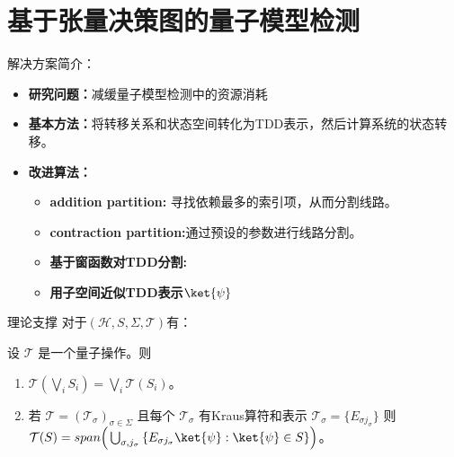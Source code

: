\documentclass[aspectratio=1610]{ctexbeamer}
\begin{document}
\section{基于张量决策图的量子模型检测}
\begin{frame}{解决方案简介：}
    \begin{itemize}
        \item \textbf{研究问题：}减缓量子模型检测中的资源消耗
        \item \textbf{基本方法：}将转移关系和状态空间转化为TDD表示，然后计算系统的状态转移。
        \item \textbf{改进算法：}
        \begin{itemize}
            \item \textbf{addition partition:} 寻找依赖最多的索引项，从而分割线路。
            \item \textbf{contraction partition:}通过预设的参数进行线路分割。
        \end{itemize}
        \begin{itemize}
            \item \textbf{基于窗函数对TDD分割:}
            \item \textbf{用子空间近似TDD表示$\ket{\psi}$}
        \end{itemize}
    \end{itemize}
\end{frame}
\begin{frame}{理论支撑}
    对于$(\mathcal{H},S,\Sigma,\mathcal{T})$有：
    \begin{theorem}
        \label{theorem-model}
        设 $\mathcal{T}$ 是一个量子操作。则
    \begin{enumerate}
        \item $\mathcal{T}(\bigvee_{i}{S_i})=\bigvee_{i}{\mathcal{T}(S_i)}$。
        \item 若 $\mathcal{T}=(\mathcal{T}_\sigma)_{\sigma \in \Sigma}$ 且每个 $\mathcal{T}_{\sigma}$ 有Kraus算符和表示 $\mathcal{T}_{\sigma}= \{ E_{\sigma j_\sigma} \}$
    则
    $\mathcal{T}(S)=span\Big(\bigcup_{\sigma,j_\sigma}{\{E_{\sigma j_\sigma}\ket{\psi}:\ket{\psi}\in S\}}\Big)$。
    \end{enumerate}
    \end{theorem}
\end{frame}
\end{document}
